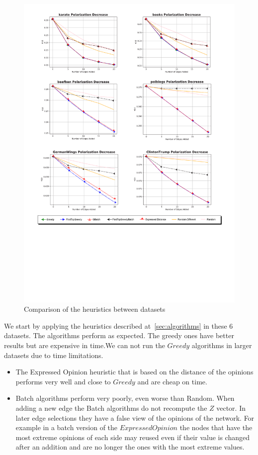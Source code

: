 \begin{figure}[!htbp]
	\begin{center}
	\advance\leftskip-1.3cm
	\captionsetup{justification=centering,margin=2cm}
	\includegraphics[width=1.2\textwidth]{Figures/heuristics}
	\caption{Comparison of the heuristics between datasets}
	\end{center}
	\label{heuristics_small}
\end{figure}
\clearpage

\noindent We start by applying the heuristics described at~\ref{sec:algorithms} in these 6 datasets. The algorithms perform as expected. The greedy ones have better results but are expensive in time.We can not run the $Greedy$ algorithms in larger datasets due to time limitations.

\begin{itemize}
  \item The Expressed Opinion heuristic that is based on the distance of the opinions performs very well and close to $Greedy$ and are cheap on time.
  \item Batch algorithms perform very poorly, even worse than Random. When adding a new edge the Batch algorithms do not recompute the $Z$ vector. In later edge selections they have a false view of the opinions of the network. For example in a batch version of the $ExpressedOpinion$ the nodes that have the most extreme opinions of each side may reused even if their value is changed after an addition and are no longer the ones with the most extreme values.
 \end{itemize}
 
